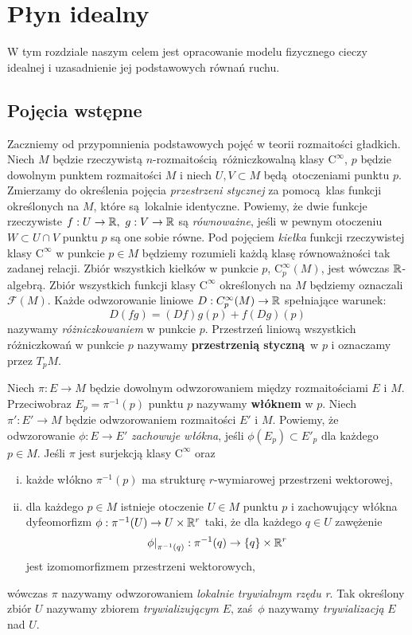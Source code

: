 \chapter{Płyn idealny} W tym rozdziale naszym celem jest opracowanie modelu fizycznego cieczy idealnej i uzasadnienie jej podstawowych równań ruchu.

\section{Pojęcia wstępne}
Zaczniemy od przypomnienia podstawowych pojęć w teorii rozmaitości gładkich. Niech \(M\) będzie rzeczywistą \(n\)-rozmaitością różniczkowalną klasy \(\mathrm{C}^\infty\), \(p\) będzie dowolnym punktem rozmaitości \(M\) i niech \(U, V\subset M\) będą otoczeniami punktu \(p\). Zmierzamy do określenia pojęcia \emph{przestrzeni stycznej} za pomocą klas funkcji określonych na \(M\), które są lokalnie identyczne. Powiemy, że dwie funkcje rzeczywiste \(f:U\to\mathbb{R},\ g:V\to\mathbb{R}\) są \emph{równoważne}, jeśli w pewnym otoczeniu \(W\subset U\cap V\) punktu \(p\) są one sobie równe. Pod pojęciem \emph{kiełka} funkcji rzeczywistej klasy \(\mathrm{C}^\infty\) w punkcie \(p\in M\) będziemy rozumieli każdą klasę równoważności tak zadanej relacji. Zbiór wszystkich kiełków w punkcie \(p\), \(\mathrm{C}_p^\infty(M)\), jest wówczas \(\mathbb{R}\)-algebrą. Zbiór wszystkich funkcji klasy \(\mathrm{C}^\infty\) określonych na \(M\) będziemy oznaczali \(\mathcal{F}(M)\). 
Każde odwzorowanie liniowe \(D:C_p^\infty(M)\to\mathbb{R}\) spełniające warunek:
\begin{equation}\label{eq:differentiation}
D(fg) = (Df)g(p) + f(Dg)(p)
\end{equation}
nazywamy \emph{różniczkowaniem} w punkcie \(p\). Przestrzeń liniową wszystkich różniczkowań w punkcie \(p\) nazywamy \textbf{przestrzenią styczną} w \(p\) i oznaczamy przez \(T_pM\).

Niech \(\pi: E\to M\) będzie dowolnym odwzorowaniem między rozmaitościami \(E\) i \(M\). Przeciwobraz \(E_p = \pi^{-1}(p)\) punktu \(p\) nazywamy \textbf{włóknem} w \(p\). Niech \(\pi': E'\to M\) będzie odwzorowaniem rozmaitości \(E'\) i \(M\). Powiemy, że odwzorowanie \(\phi:E\to E'\) \emph{zachowuje włókna}, jeśli \(\phi(E_p)\subset E'_p\) dla każdego \(p\in M\). Jeśli \(\pi\) jest surjekcją klasy \(\mathrm{C}^\infty\) oraz
\begin{enumerate}[i)]
    \item każde włókno \(\pi^{-1}(p)\) ma strukturę \(r\)-wymiarowej przestrzeni wektorowej,
\item dla każdego \(p\in M\) istnieje otoczenie \(U\in M\) punktu \(p\) i zachowujący włókna dyfeomorfizm \(\phi: \pi^{-1}(U)\to U\times \mathbb{R}^r\) taki, że dla każdego \(q\in U\) zawężenie
\begin{equation*}
\left.\phi\right|_{\pi^{-1}(q)}:\pi^{-1}(q)\to \{q\} \times \mathbb{R}^r
\end{equation*}
jest izomomorfizmem przestrzeni wektorowych,

\end{enumerate}
wówczas \(\pi\) nazywamy odwzorowaniem \emph{lokalnie trywialnym rzędu r}.  Tak określony zbiór \(U\) nazywamy zbiorem \emph{trywializującym} \(E\), zaś \(\phi\) nazywamy \emph{trywializacją} \(E\) nad \(U\).

